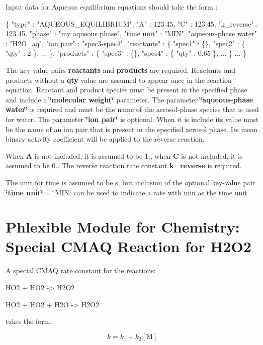 Input data for Aqueous equilibrium equations should take the form \+: 
\begin{DoxyCode}
\{
  "type" : "AQUEOUS\_EQUILIBRIUM",
  "A" : 123.45,
  "C" : 123.45,
  "k\_reverse" : 123.45,
  "phase" : "my aqueous phase",
  "time unit" : "MIN",
  "aqueous-phase water" : "H2O\_aq",
  "ion pair" : "spec3-spec4",
  "reactants" : \{
    "spec1" : \{\},
    "spec2" : \{ "qty" : 2 \},
    ...
  \},
  "products" : \{
    "spec3" : \{\},
    "spec4" : \{ "qty" : 0.65 \},
    ...
  \}
  ...
\}
\end{DoxyCode}
 The key-\/value pairs {\bfseries reactants} and {\bfseries products} are required. Reactants and products without a {\bfseries qty} value are assumed to appear once in the reaction equation. Reactant and product species must be present in the specified phase and include a {\bfseries \char`\"{}molecular weight\char`\"{}} parameter. The parameter {\bfseries \char`\"{}aqueous-\/phase water\char`\"{}} is required and must be the name of the aerosol-\/phase species that is used for water. The parameter {\bfseries \char`\"{}ion pair\char`\"{}} is optional. When it is include its value must be the name of an ion pair that is present in the specified aerosol phase. Its mean binary activity coefficient will be applied to the reverse reaction.

When {\bfseries A} is not included, it is assumed to be 1., when {\bfseries C} is not included, it is assumed to be 0.. The reverse reaction rate constant {\bfseries k\+\_\+reverse} is required.

The unit for time is assumed to be s, but inclusion of the optional key-\/value pair {\bfseries \char`\"{}time unit\char`\"{}} = \char`\"{}\+M\+I\+N\char`\"{} can be used to indicate a rate with min as the time unit. \hypertarget{phlex_rxn_CMAQ_H2O2}{}\section{Phlexible Module for Chemistry\+: Special C\+M\+AQ Reaction for H2\+O2}\label{phlex_rxn_CMAQ_H2O2}
A special C\+M\+AQ rate constant for the reactions\+:

\begin{ch} HO2 + HO2 -> H2O2 \end{ch} \begin{ch} HO2 + HO2 + H2O -> H2O2 \end{ch}

takes the form\+:

\[ k=k_1+k_2[\mbox{M}] \]

